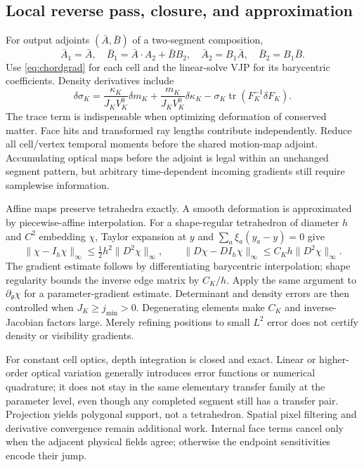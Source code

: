 \documentclass[10pt,letterpaper]{article}
\theoremstyle{remark}\newtheorem{counterexample}[proposition]{Counterexample}
\newcommand{\tr}{\operatorname{tr}}
\begin{document}
\subsection{Local reverse pass, closure, and approximation}
For output adjoints $(\bar A,\bar B)$ of a two-segment composition,
\begin{equation}
 \bar A_1=\bar A,\quad \bar B_1=\bar A\cdot A_2+\bar B B_2,\quad
 \bar A_2=B_1\bar A,\quad \bar B_2=B_1\bar B. \label{eq:transferadj}
\end{equation}
Use \eqref{eq:chordgrad} for each cell and the linear-solve VJP for its barycentric coefficients. Density derivatives include
\begin{equation}
 \delta\sigma_K=\frac{\kappa_K}{J_KV_K^0}\delta m_K
 +\frac{m_K}{J_KV_K^0}\delta\kappa_K
 -\sigma_K\tr(F_K^{-1}\delta F_K). \label{eq:densitygrad}
\end{equation}
The trace term is indispensable when optimizing deformation of conserved matter. Face hits and transformed ray lengths contribute independently. Reduce all cell/vertex temporal moments before the shared motion-map adjoint. Accumulating optical maps before the adjoint is legal within an unchanged segment pattern, but arbitrary time-dependent incoming gradients still require samplewise information.

Affine maps preserve tetrahedra exactly. A smooth deformation is approximated by piecewise-affine interpolation. For a shape-regular tetrahedron of diameter $h$ and $C^2$ embedding $\chi$, Taylor expansion at $y$ and $\sum_a\xi_a(y_a-y)=0$ give
\begin{equation}
 \|\chi-I_h\chi\|_\infty\leq\tfrac12h^2\|D^2\chi\|_\infty,\qquad
 \|D\chi-DI_h\chi\|_\infty\leq C_Kh\|D^2\chi\|_\infty. \label{eq:feerror}
\end{equation}
The gradient estimate follows by differentiating barycentric interpolation; shape regularity bounds the inverse edge matrix by $C_K/h$. Apply the same argument to $\partial_\theta\chi$ for a parameter-gradient estimate. Determinant and density errors are then controlled when $J_K\geq j_{\min}>0$. Degenerating elements make $C_K$ and inverse-Jacobian factors large. Merely refining positions to small $L^2$ error does not certify density or visibility gradients.

For constant cell optics, depth integration is closed and exact. Linear or higher-order optical variation generally introduces error functions or numerical quadrature; it does not stay in the same elementary transfer family at the parameter level, even though any completed segment still has a transfer pair. Projection yields polygonal support, not a tetrahedron. Spatial pixel filtering and derivative convergence remain additional work. Internal face terms cancel only when the adjacent physical fields agree; otherwise the endpoint sensitivities encode their jump.
\end{document}
